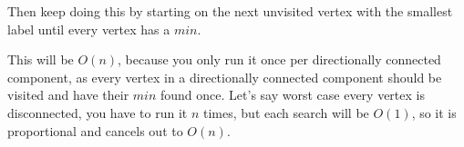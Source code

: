 \documentclass[11pt,letterpaper]{article}
\begin{document}
	Then keep doing this by starting on the next unvisited vertex with the smallest label until every vertex has a $min$.
	
	This will be $O(n)$, because you only run it once per directionally connected component, as every vertex in a directionally connected component should be visited and have their $min$ found once. Let's say worst case every vertex is disconnected, you have to run it $n$ times, but each search will be $O(1)$, so it is proportional and cancels out to $O(n)$.
	
\end{document}
